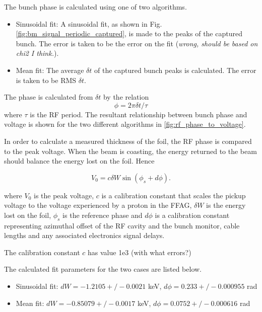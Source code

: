 \documentclass{paper}
\begin{document}
The bunch phase is calculated using one of two algorithms.
\begin{itemize}
\item Sinusoidal fit: A sinusoidal fit, as shown in Fig. 
\ref{fig:bm_signal_periodic_captured}, is made to the peaks of the captured
bunch. The error is taken to be the error on the fit (\emph{wrong, should be
based on chi2 I think.}).
\item Mean fit: The average $\delta t$ of the captured bunch peaks  is 
calculated. The error is taken to be RMS $\delta t$.
\end{itemize}
The phase is calculated from $\delta t$ by the relation
\begin{equation}
\phi = 2 \pi \delta t / \tau
\end{equation}
where $\tau$ is the RF period. The resultant relationship between bunch phase 
and voltage is shown for the two different algorithms in 
\ref{fig:rf_phase_to_voltage}.

In order to calculate a measured thickness of the foil, the RF phase is compared
to the peak voltage. When the beam is coasting, the energy returned to the beam
should balance the energy lost on the foil. Hence

\begin{equation}
V_0 = c\delta W \sin (\phi_s+d\phi).
\end{equation}

where $V_0$ is the peak voltage, $c$ is a calibration constant that scales the
pickup voltage to the voltage experienced by a proton in the FFAG, $\delta W$ is
the energy lost on the foil, $\phi_s$ is the reference phase and $d\phi$ is a 
calibration constant representing azimuthal offset of the RF cavity and the 
bunch monitor, cable lengths and any associated electronics signal delays.

The calibration constant $c$ has value 1e3 (with what errors?)

The calculated fit parameters for the two cases are listed below.
\begin{itemize}
\item Sinusoidal fit: $dW = -1.2105 +/- 0.0021$ keV, $d\phi = 0.233 +/- 0.000955$ rad
\item Mean fit: $dW =-0.85079 +/- 0.0017$ keV, $d\phi = 0.0752 +/- 0.000616$ rad
\end{itemize}
\end{document}
